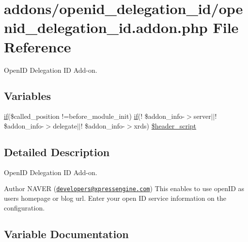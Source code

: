 \hypertarget{openid__delegation__id_8addon_8php}{}\section{addons/openid\+\_\+delegation\+\_\+id/openid\+\_\+delegation\+\_\+id.addon.\+php File Reference}
\label{openid__delegation__id_8addon_8php}


Open\+ID Delegation ID Add-\/on.  


\subsection*{Variables}
\begin{DoxyCompactItemize}
\item 
\hyperlink{config_8inc_8php_a73b98c0274e28635a594091f9ca43cb4}{if}(\$called\+\_\+position !=\textquotesingle{}before\+\_\+module\+\_\+init\textquotesingle{}) \hyperlink{config_8inc_8php_a73b98c0274e28635a594091f9ca43cb4}{if}(! \$addon\+\_\+info-\/$>$server$\vert$$\vert$! \$addon\+\_\+info-\/$>$delegate$\vert$$\vert$! \$addon\+\_\+info-\/$>$xrds) \hyperlink{openid__delegation__id_8addon_8php_accbe833cdba0e2efb425bd7ea757bb4b}{\$header\+\_\+script}
\end{DoxyCompactItemize}


\subsection{Detailed Description}
Open\+ID Delegation ID Add-\/on. 

\begin{DoxyAuthor}{Author}
N\+A\+V\+ER (\href{mailto:developers@xpressengine.com}{\tt developers@xpressengine.\+com}) This enables to use open\+ID as user\textquotesingle{}s homepage or blog url. Enter your open ID service information on the configuration. 
\end{DoxyAuthor}


\subsection{Variable Documentation}
\hypertarget{openid__delegation__id_8addon_8php_accbe833cdba0e2efb425bd7ea757bb4b}{}\label{openid__delegation__id_8addon_8php_accbe833cdba0e2efb425bd7ea757bb4b} 
